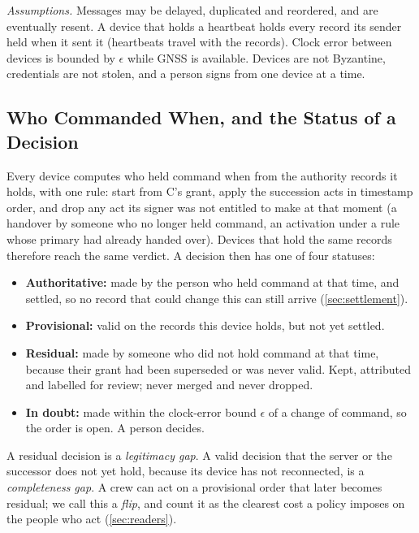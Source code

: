 \textit{Assumptions.} Messages may be delayed, duplicated and reordered, and are eventually
resent. A device that holds a heartbeat holds every record its sender held when it sent it
(heartbeats travel with the records). Clock error between devices is bounded by $\epsilon$
while GNSS is available. Devices are not Byzantine, credentials are not stolen, and a person
signs from one device at a time.

\subsection{Who Commanded When, and the Status of a Decision}
\label{sec:statuses}

Every device computes who held command when from the authority records it holds, with one
rule: start from C's grant, apply the succession acts in timestamp order, and drop any act
its signer was not entitled to make at that moment (a handover by someone who no longer
held command, an activation under a rule whose primary had already handed over). Devices
that hold the same records therefore reach the same verdict. A decision then has one of
four statuses:
\begin{itemize}
  \item \textbf{Authoritative:} made by the person who held command at that time, and
  settled, so no record that could change this can still arrive (\cref{sec:settlement}).
  \item \textbf{Provisional:} valid on the records this device holds, but not yet settled.
  \item \textbf{Residual:} made by someone who did not hold command at that time, because
  their grant had been superseded or was never valid. Kept, attributed and labelled for
  review; never merged and never dropped.
  \item \textbf{In doubt:} made within the clock-error bound $\epsilon$ of a change of
  command, so the order is open. A person decides.
\end{itemize}
A residual decision is a \emph{legitimacy gap}. A valid decision that the server or the
successor does not yet hold, because its device has not reconnected, is a
\emph{completeness gap}. A crew can act on a provisional order that later becomes
residual; we call this a \emph{flip}, and count it as the clearest cost a policy imposes on
the people who act (\cref{sec:readers}). 


